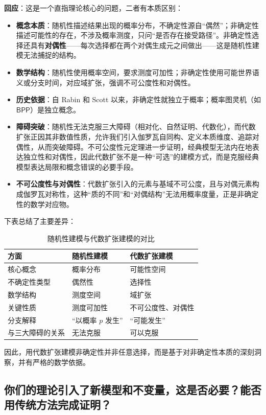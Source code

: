 \documentclass{ctexart}
\begin{document}
	\textbf{回应}：这是一个直指理论核心的问题，二者有本质区别：
	\begin{itemize}
		\item \textbf{概念本质}：随机性描述结果出现的概率分布，不确定性源自``偶然''；非确定性描述可能性的存在，不涉及概率测度，只问``是否存在接受路径''。非确定性选择还具有\textbf{对偶性}——每次选择都在两个对偶生成元之间做出——这是随机性建模无法捕捉的结构。
		\item \textbf{数学结构}：随机性使用概率空间，要求测度可加性；非确定性使用可能世界语义或分支时间，对应域扩张，强调不可公度性和对偶性。
		\item \textbf{历史依据}：自 Rabin 和 Scott 以来，非确定性就独立于概率；概率图灵机（如 $\mathsf{BPP}$）是独立概念。
		\item \textbf{障碍突破}：随机性无法克服三大障碍（相对化、自然证明、代数化），而代数扩张正因其非数值性质，允许我们引入伽罗瓦自同构、定义本质维度、追踪对偶性，从而突破障碍。不可公度性元定理进一步证明，经典模型无法内在地表达独立性和对偶性，因此代数扩张不是一种``可选''的建模方式，而是克服经典模型表达局限和概念错误的必要手段。
		\item \textbf{不可公度性与对偶性}：代数扩张引入的元素与基域不可公度，且与对偶元素构成伽罗瓦对称性，这种``质的不同''和``对偶结构''无法用概率度量，正是非确定性的数学对应物。
	\end{itemize}
	下表总结了主要差异：
	\begin{table}[h]
		\centering
		\caption{随机性建模与代数扩张建模的对比}
		\label{tab:comparison}
		\begin{tabular}{p{4cm} p{4cm} p{4cm}}
			\hline
			\textbf{方面} & \textbf{随机性建模} & \textbf{代数扩张建模} \\
			\hline
			核心概念 & 概率分布 & 可能性空间 \\
			不确定性类型 & 偶然性 & 选择性 \\
			数学结构 & 测度空间 & 域扩张 \\
			关键性质 & 测度可加性 & 不可公度性、对偶性 \\
			分支解释 & ``以概率 $p$ 发生'' & ``可能发生'' \\
			与三大障碍的关系 & 无法克服 & 可以克服 \\
			\hline
		\end{tabular}
	\end{table}
	因此，用代数扩张建模非确定性并非任意选择，而是基于对非确定性本质的深刻洞察，并有严格的数学依据。
	
	
	\subsection{你们的理论引入了新模型和不变量，这是否必要？能否用传统方法完成证明？}
	
\end{document}
